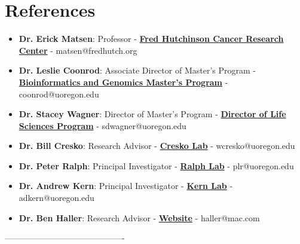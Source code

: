 \documentclass[letterpaper,11pt]{article}
\let\oldhref\href
\renewcommand{\href}[2]{\oldhref{#1}{\bfseries#2}}
\newcommand{\resumeItem}[2]{
  \item\small{
    \textbf{#1}{: #2 \vspace{-2pt}}
  }
}
\newcommand{\resumeSubItem}[2]{\resumeItem{#1}{#2}\vspace{-4pt}}
\newcommand{\resumeSubHeadingListStart}{\begin{itemize}[leftmargin=*]}
\newcommand{\resumeSubHeadingListEnd}{\end{itemize}}
\begin{document}
\section{References}


\resumeSubHeadingListStart
    
    \resumeSubItem {Dr. Erick Matsen}
        {Professor -
        \href{https://www.fredhutch.org/en/faculty-lab-directory/matsen-frederick.html}
        {Fred Hutchinson Cancer Research Center} -
        matsen@fredhutch.org}
    \resumeSubItem {Dr. Leslie Coonrod}
        {Associate Director of Master's Program -
        \href{https://accelerate.uoregon.edu/leslie-coonrod}
        {Bioinformatics and Genomics Master's Program} -
        coonrod@uoregon.edu}
    \resumeSubItem {Dr. Stacey Wagner}
        {Director of Master's Program -
        \href{https://accelerate.uoregon.edu/stacey-wagner}
        {Director of Life Sciences Program} - 
        sdwagner@uoregon.edu}
    \resumeSubItem {Dr. Bill Cresko}
        {Research Advisor -
        \href{https://creskolab.uoregon.edu/}
        {Cresko Lab} - 
        wcresko@uoregon.edu}
    \resumeSubItem {Dr. Peter Ralph}
        {Principal Investigator -
        \href{https://pages.uoregon.edu/plr/}
        {Ralph Lab} - 
        plr@uoregon.edu}
    \resumeSubItem {Dr. Andrew Kern}
        {Principal Investigator -
        \href{http://www.kernlab.org/} 
        {Kern Lab} -
        adkern@uoregon.edu}
    \resumeSubItem {Dr. Ben Haller}
        {Research Advisor - 
        \href{http://benhaller.com/}
        {Website} - 
        haller@mac.com}
\resumeSubHeadingListEnd

-------------------------------------------
\end{document}
